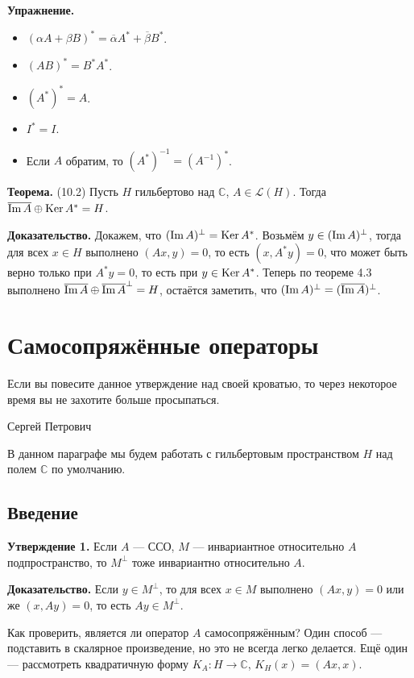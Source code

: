\textbf{Упражнение.}
\begin{itemize}
    \item $(\alpha A + \beta B)^* = \overline \alpha A^* + \overline \beta B^*$.
    \item $(AB)^* = B^* A^*$.
    \item $(A^*)^* = A$.
    \item $I^* = I$.
    \item Если $A$ обратим, то $(A^*)^{-1} = (A^{-1})^*$.
\end{itemize}

\label{th:10-2} \textbf{Теорема.} (10.2) Пусть $H$ гильбертово над $\mathbb C$, $A \in \mathcal L(H)$.
Тогда $\overline{\operatorname{Im} A} \oplus \operatorname{Ker} A^* = H$.

\textbf{Доказательство.} Докажем, что $(\operatorname{Im} A)^\bot = \operatorname{Ker} A^*$.
Возьмём $y \in (\operatorname{Im} A)^\bot$, тогда для всех $x \in H$ выполнено $(Ax, y) = 0$, то есть $(x, A^* y) = 0$, что может быть верно только при $A^* y = 0$, то есть при $y \in \operatorname{Ker} A^*$.
Теперь по теореме 4.3 выполнено $\overline{\operatorname{Im} A} \oplus \overline{\operatorname{Im} A}^\bot = H$, остаётся заметить, что $(\operatorname{Im} A)^\bot = (\overline{\operatorname{Im} A})^\bot$.

\QED

\section{Самосопряжённые операторы}
\epigraph{Если вы повесите данное утверждение над своей кроватью, то через некоторое время вы не захотите больше просыпаться.}{Сергей Петрович}
В данном параграфе мы будем работать с гильбертовым пространством $H$ над полем $\mathbb C$ по умолчанию.

\subsection{Введение}
\textbf{Утверждение 1.} Если $A$ --- ССО, $M$ --- инвариантное относительно $A$ подпространство, то $M^\bot$ тоже инвариантно относительно $A$.

\textbf{Доказательство.} Если $y \in M^\bot$, то для всех $x \in M$ выполнено $(Ax, y) = 0$ или же $(x, Ay) = 0$, то есть $Ay \in M^\bot$.

\QED

Как проверить, является ли оператор $A$ самосопряжённым?
Один способ --- подставить в скалярное произведение, но это не всегда легко делается.
Ещё один --- рассмотреть квадратичную форму $K_A: H \to \mathbb C$, $K_H(x) = (Ax, x)$.

